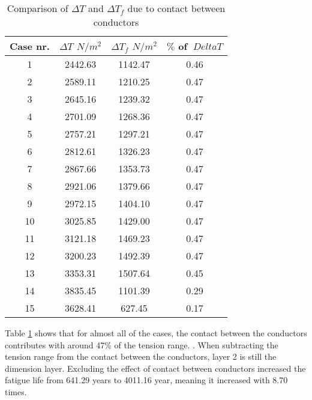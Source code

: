 \begin{table} [H]
\centering
\begin{tabular}{ |c|c|c|c|}
\hline
	Case nr.  & $\Delta T$ $N/m^2$ & $\Delta T_f$ $N/m^2$ & $\%$ of $\ Delta T$ \\ 
 \hline
 \hline
	1 & 2442.63 & 1142.47 & 0.46  \\ 
	2 & 2589.11 & 1210.25 & 0.47   \\ 
	3 & 2645.16 & 1239.32 & 0.47   \\ 
	4 & 2701.09 & 1268.36 & 0.47   \\
	5 & 2757.21 & 1297.21 & 0.47   \\ 
	6 & 2812.61 & 1326.23 & 0.47  \\ 
	7 & 2867.66 & 1353.73 & 0.47   \\ 
	8 & 2921.06 & 1379.66 & 0.47  \\ 
	9 & 2972.15 & 1404.10 & 0.47  \\ 
	10 & 3025.85 & 1429.00 & 0.47   \\ 
	11 & 3121.18 & 1469.23 & 0.47   \\ 
	12 & 3200.23 & 1492.39 & 0.47  \\ 
	13 & 3353.31 & 1507.64 & 0.45   \\ 
	14 & 3835.45 & 1101.39 & 0.29   \\ 
	15 & 3628.41 & 627.45 & 0.17   \\ 
\hline
\end{tabular}
\caption{Comparison of $\Delta T$ and $\Delta T_f$ due to contact between conductors}
\label{table:tensfri}
\end{table}
Table \ref{table:tensfri} shows that for almost all of the cases, the contact between the conductors contributes with around 47\% of the tension range. . When subtracting the tension range from the contact between the conductors, layer 2 is still the dimension layer. Excluding the effect of contact between conductors increased the fatigue life from 641.29 years to 4011.16 year, meaning it increased with 8.70 times. 

